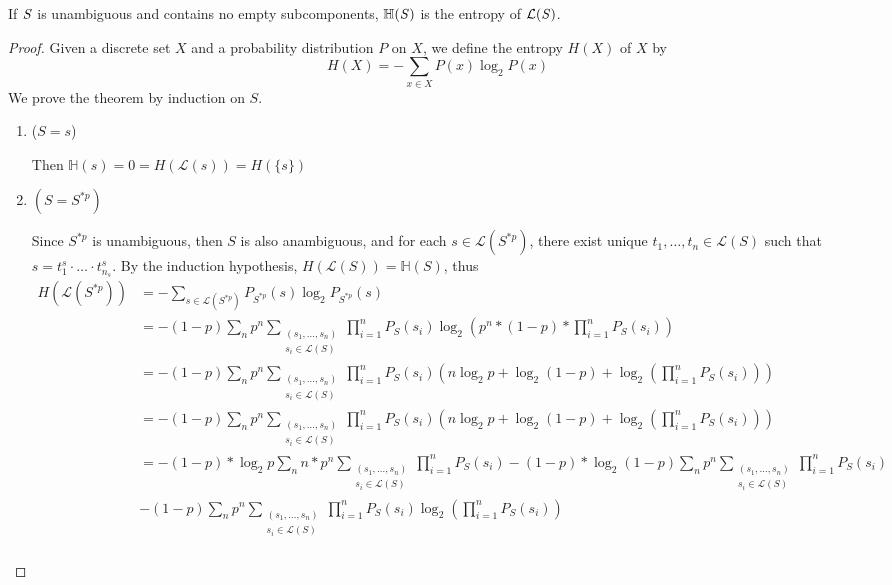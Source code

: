 \documentclass[acmsmall,screen,anonymous]{acmart}
\begin{document}
\begin{theorem}
  \label{CorrectEntropy}
  If $\mathit{S}$ is unambiguous and contains no empty subcomponents,
  $\mathbb{H}(\mathit{S})$ is the entropy of $\mathcal{L}(\mathit{S})$.
\end{theorem}
\begin{proof}
Given a discrete set $X$ and a probability distribution $P$ on $X$, we define the entropy $H(X)$ of $X$ by
$$H(X) = -\sum_{x \in X}P(x)\log_2{P(x)}$$
We prove the theorem by induction on $S$.
\begin{enumerate}
\item
($S = s$)

Then $\mathbb{H}(s) = 0 = H(\mathcal{L}(s)) = H(\{s\})$
\item
$(S = S^{*p})$

Since $S^{*p}$ is unambiguous, then $S$ is also anambiguous, and for each $s \in \mathcal{L}(S^{*p})$, there exist unique $t_1, \ldots, t_n \in \mathcal{L}(S)$ such that $s = t^s_1 \cdot \ldots \cdot t^s_{n_s}$. By the induction hypothesis, $H(\mathcal{L}(S)) = \mathbb{H}(S)$, thus
\begin{align*}
H(\mathcal{L}(S^{*p})) &= - \sum_{s \in \mathcal{L}(S^{*p})} P_{S^{*p}}(s) \log_2 P_{S^{*p}}(s)\\
&= -(1-p)\sum_n p^n \sum_{\substack{(s_1, \ldots, s_n) \\ s_i \in \mathcal{L}(S)}} \prod_{i=1}^n P_S(s_i)\log_2 \left(p^n * (1 - p) * \prod_{i=1}^n P_S(s_i)\right)\\
&= -(1-p)\sum_n p^n \sum_{\substack{(s_1, \ldots, s_n) \\ s_i \in \mathcal{L}(S)}} \prod_{i=1}^n P_S(s_i)\left(n \log_2 p  + \log_2 (1 - p) + \log_2 \left(\prod_{i=1}^n P_S(s_i)\right)\right)\\
&= -(1-p)\sum_n p^n \sum_{\substack{(s_1, \ldots, s_n) \\ s_i \in \mathcal{L}(S)}} \prod_{i=1}^n P_S(s_i)\left(n \log_2 p  + \log_2 (1 - p) + \log_2 \left(\prod_{i=1}^n P_S(s_i)\right)\right)\\
&= -(1-p) * \log_2 p \sum_n n * p^n \sum_{\substack{(s_1, \ldots, s_n) \\ s_i \in \mathcal{L}(S)}} \prod_{i=1}^n P_S(s_i)
-(1-p) * \log_2 (1 - p) \sum_n p^n \sum_{\substack{(s_1, \ldots, s_n) \\ s_i \in \mathcal{L}(S)}} \prod_{i=1}^n P_S(s_i) \\
&-(1-p)\sum_n p^n \sum_{\substack{(s_1, \ldots, s_n) \\ s_i \in \mathcal{L}(S)}} \prod_{i=1}^n P_S(s_i)\log_2 \left(\prod_{i=1}^n P_S(s_i)\right)\\

\end{align*}
\end{enumerate}
\end{proof}
\end{document}
